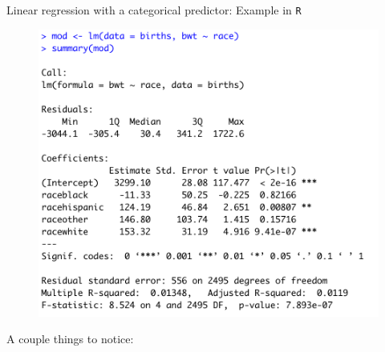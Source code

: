 \documentclass[10pt,t]{beamer}
\begin{document}
\begin{frame}{Linear regression with a categorical predictor: Example in \texttt{R}}

\begin{figure}
	\centering \includegraphics[scale=0.3]{multilevel_cat_lm.png}
\end{figure}

\vspace{0.1cm}

A couple things to notice:


\end{frame}
\end{document}
